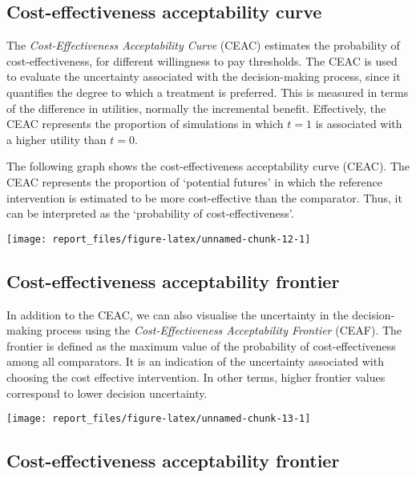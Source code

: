 \documentclass[
]{article}
\begin{document}
\hypertarget{cost-effectiveness-acceptability-curve}{%
\subsection{Cost-effectiveness acceptability
curve}\label{cost-effectiveness-acceptability-curve}}

The \emph{Cost-Effectiveness Acceptability Curve} (CEAC) estimates the
probability of cost-effectiveness, for different willingness to pay
thresholds. The CEAC is used to evaluate the uncertainty associated with
the decision-making process, since it quantifies the degree to which a
treatment is preferred. This is measured in terms of the difference in
utilities, normally the incremental benefit. Effectively, the CEAC
represents the proportion of simulations in which \(t=1\) is associated
with a higher utility than \(t=0\).

The following graph shows the cost-effectiveness acceptability curve
(CEAC). The CEAC represents the proportion of `potential futures' in
which the reference intervention is estimated to be more cost-effective
than the comparator. Thus, it can be interpreted as the `probability of
cost-effectiveness'.

\begin{center}\texttt{[image: report\_files/figure-latex/unnamed-chunk-12-1]} \end{center}

\hypertarget{cost-effectiveness-acceptability-frontier}{%
\subsection{Cost-effectiveness acceptability
frontier}\label{cost-effectiveness-acceptability-frontier}}

In addition to the CEAC, we can also visualise the uncertainty in the
decision-making process using the \emph{Cost-Effectiveness Acceptability
Frontier} (CEAF). The frontier is defined as the maximum value of the
probability of cost-effectiveness among all comparators. It is an
indication of the uncertainty associated with choosing the cost
effective intervention. In other terms, higher frontier values
correspond to lower decision uncertainty.

\begin{center}\texttt{[image: report\_files/figure-latex/unnamed-chunk-13-1]} \end{center}

\hypertarget{cost-effectiveness-acceptability-frontier-1}{%
\subsection{Cost-effectiveness acceptability
frontier}\label{cost-effectiveness-acceptability-frontier-1}}
\end{document}
